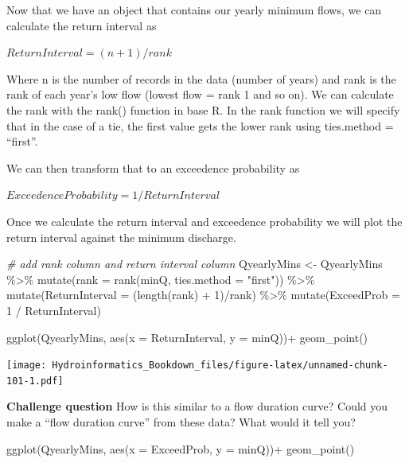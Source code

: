 \documentclass[
]{book}
\newenvironment{Shaded}{\begin{snugshade}}{\end{snugshade}}
\newcommand{\AttributeTok}[1]{\textcolor[rgb]{0.77,0.63,0.00}{#1}}
\newcommand{\CommentTok}[1]{\textcolor[rgb]{0.56,0.35,0.01}{\textit{#1}}}
\newcommand{\DecValTok}[1]{\textcolor[rgb]{0.00,0.00,0.81}{#1}}
\newcommand{\FunctionTok}[1]{\textcolor[rgb]{0.00,0.00,0.00}{#1}}
\newcommand{\NormalTok}[1]{#1}
\newcommand{\OtherTok}[1]{\textcolor[rgb]{0.56,0.35,0.01}{#1}}
\newcommand{\SpecialCharTok}[1]{\textcolor[rgb]{0.00,0.00,0.00}{#1}}
\newcommand{\StringTok}[1]{\textcolor[rgb]{0.31,0.60,0.02}{#1}}
\begin{document}
Now that we have an object that contains our yearly minimum flows, we can calculate the return interval as

\(Return Interval = (n + 1) / rank\)

Where n is the number of records in the data (number of years) and rank is the rank of each year's low flow (lowest flow = rank 1 and so on). We can calculate the rank with the rank() function in base R. In the rank function we will specify that in the case of a tie, the first value gets the lower rank using ties.method = ``first''.

We can then transform that to an exceedence probability as

\(Exceedence Probability = 1 / Return Interval\)

Once we calculate the return interval and exceedence probability we will plot the return interval against the minimum discharge.

\begin{Shaded}
\begin{Highlighting}[]
\CommentTok{\# add rank column and return interval column}
\NormalTok{QyearlyMins }\OtherTok{\textless{}{-}}\NormalTok{ QyearlyMins }\SpecialCharTok{\%\textgreater{}\%} 
                \FunctionTok{mutate}\NormalTok{(}\AttributeTok{rank =} \FunctionTok{rank}\NormalTok{(minQ, }\AttributeTok{ties.method =} \StringTok{"first"}\NormalTok{)) }\SpecialCharTok{\%\textgreater{}\%}
                \FunctionTok{mutate}\NormalTok{(}\AttributeTok{ReturnInterval =}\NormalTok{ (}\FunctionTok{length}\NormalTok{(rank) }\SpecialCharTok{+} \DecValTok{1}\NormalTok{)}\SpecialCharTok{/}\NormalTok{rank) }\SpecialCharTok{\%\textgreater{}\%}
                \FunctionTok{mutate}\NormalTok{(}\AttributeTok{ExceedProb =} \DecValTok{1} \SpecialCharTok{/}\NormalTok{ ReturnInterval)}
      
\FunctionTok{ggplot}\NormalTok{(QyearlyMins, }\FunctionTok{aes}\NormalTok{(}\AttributeTok{x =}\NormalTok{ ReturnInterval, }\AttributeTok{y =}\NormalTok{ minQ))}\SpecialCharTok{+}
  \FunctionTok{geom\_point}\NormalTok{()}
\end{Highlighting}
\end{Shaded}

\texttt{[image: Hydroinformatics\_Bookdown\_files/figure-latex/unnamed-chunk-101-1.pdf]}

\textbf{Challenge question} How is this similar to a flow duration curve? Could you make a ``flow duration curve'' from these data? What would it tell you?

\begin{Shaded}
\begin{Highlighting}[]
\FunctionTok{ggplot}\NormalTok{(QyearlyMins, }\FunctionTok{aes}\NormalTok{(}\AttributeTok{x =}\NormalTok{ ExceedProb, }\AttributeTok{y =}\NormalTok{ minQ))}\SpecialCharTok{+}
  \FunctionTok{geom\_point}\NormalTok{()}
\end{Highlighting}
\end{Shaded}
\end{document}
